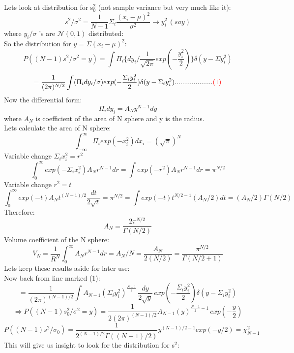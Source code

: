 \documentclass[11pt]{article}
\begin{document}
	Lets look at distribution for s$_0^2$ (not sample variance but very much like it):
	\[
	s^2/\sigma^2 = \frac{1}{N-1}\Sigma_i \frac{(x_i - \mu)^2}{\sigma^2} \rightarrow y_i^2 \, (say) 
	\]
	where $y_i/\sigma$ 's are $\mathcal{N}(0,1)$ distributed:\\
	So the distribution for $y = \Sigma(x_i-\mu)^2$:
	\[
		P((N-1)s^2/\sigma^2=y) = \int \Pi_i \{dy_i/ \frac{1}{\sqrt{2\pi}}exp(-\frac{y_i^2}{2})\}\delta(y - \Sigma y_i^2) 
	\]
	\[
		= \frac{1}{(2\pi)^{N/2}}\int (\Pi_i dy_i/\sigma) exp(-\frac{\Sigma_i y_i^2}{2})\delta(y- \Sigma_i y_i^2)....................{\color{red}(1)}
	\]
	Now the differential form:
	\[
	\Pi_i dy_i = A_{N} y^{N-1} dy
	\]
	where $A_N$ is coefficient of the area of N sphere and y is the radius.\\
	Lets calculate the area of N sphere:
	\[
	\int_{-\infty}^\infty \Pi_i exp(-x_i^2) dx_i = (\sqrt{\pi})^N
	\]
	Variable change $\Sigma_i x_i^2 = r^2$
	\[
	\int_0^\infty exp(-\Sigma_i x_i^2) A_N r^{N-1} dr = \int exp(-r^2) A_N r^{N-1} dr = \pi^{N/2}
	\]
	Variable change $r^2 = t$
	\[
	\int_0^\infty exp(-t)A_N t^{(N-1)/2} \frac{dt}{2\sqrt{t}} =\pi^{N/2} = \int exp(-t)t^{N/2 - 1} (A_N/2) dt = (A_N/2)\Gamma(N/2)
	\]
	Therefore:
	\[
	A_N = \frac{2\pi^{N/2}}{\Gamma(N/2)}
	\]
	Volume coefficient of the N sphere:
	\[
	V_N  = \frac{1}{R^N} \int_0^\infty A_N r^{N-1} dr = A_N /N = \frac{A_N}{2(N/2)} = \frac{\pi^{N/2}}{\Gamma(N/2 + 1)}
	\]
	Lets keep these results aside for later use:\\
	Now back from line marked (1):
	\[
		= \frac{1}{(2\pi)^{(N-1)/2}} \int A_{N-1} (\Sigma_i y_i^2)^{\frac{N-1}{2}} \, \frac{dy}{2\sqrt{y}} \, exp(-\frac{\Sigma_i y_i^2}{2}) \delta(y-\Sigma_i y_i^2) 			
	\]
	\[
		\Rightarrow P((N-1)s_0^2/\sigma^2 = y) = \frac{1}{2(2\pi)^{(N-1)/2}}  A_{N-1} (y)^{\frac{N-1}{2}-1} \, exp(-\frac{y}{2})
	\]
	\[
		\boxed{P((N-1)s^2/\sigma_0)= \frac{1}{2^{(N-1)/2}\Gamma((N-1)/2)}y^{(N-1)/2-1} exp(-y/2) = \chi^2_{N-1}}
	\]
	This will give us insight to look for the distribution for s$^2$:
	
	
	
\end{document}
